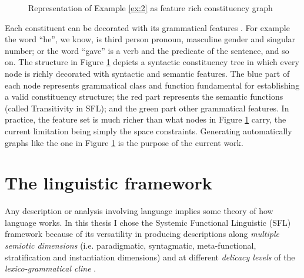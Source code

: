 \begin{figure}[!ht]
	\caption{Representation of Example \ref{ex:2} as feature rich constituency graph}
	\label{fig:mcg-graph-example}
\end{figure}

Each constituent can be decorated with its grammatical features . For example the word ``he'', we know, is third person pronoun, masculine gender and singular number; or the word ``gave'' is a verb and the predicate of the sentence, and so on. The structure in Figure \ref{fig:mcg-graph-example} depicts a syntactic constituency tree in which every node is richly decorated with syntactic and semantic features. The blue part of each node represents grammatical class and function fundamental for establishing a valid constituency structure; the red part represents the semantic functions (called Transitivity in SFL); and the green part other grammatical features. In practice, the feature set is much richer than what nodes in Figure \ref{fig:mcg-graph-example} carry, the current limitation being simply the space constraints. Generating automatically graphs like the one in Figure \ref{fig:mcg-graph-example} is the purpose of the current work. 

\section{The linguistic framework}
Any description or analysis involving language implies some theory of how language works. In this thesis I chose the Systemic Functional Linguistic (SFL) framework because of its versatility in producing descriptions along \textit{multiple semiotic dimensions} \citep{Halliday2003} (i.e. paradigmatic, syntagmatic, meta-functional, stratification and instantiation dimensions) and at different \textit{delicacy levels} of the \textit{lexico-grammatical cline} \citep{Halliday2002, Hasan2014}. 


